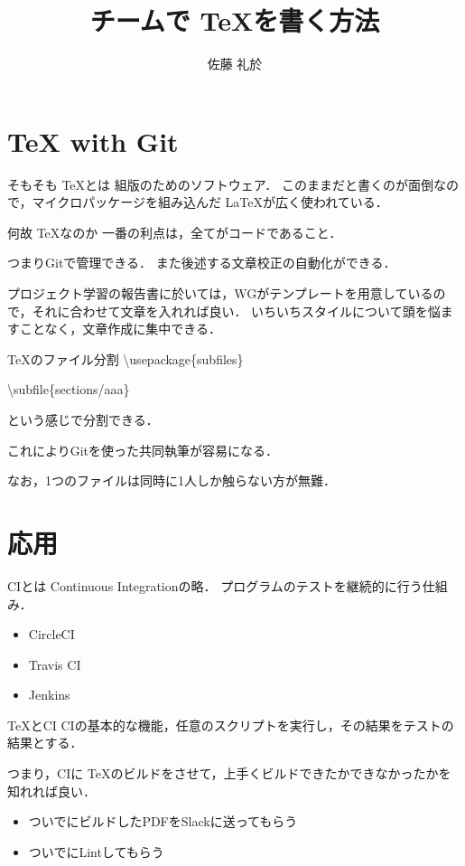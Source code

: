 \documentclass{beamer}
\title{チームで \TeX を書く方法}
\author{佐藤 礼於}
\begin{document}
\maketitle

\section{TeX with Git}

\begin{frame}{そもそも \TeX とは}
  組版のためのソフトウェア．
  このままだと書くのが面倒なので，マイクロパッケージを組み込んだ \LaTeX が広く使われている．
\end{frame}

\begin{frame}{何故 \TeX なのか}
  一番の利点は，全てがコードであること．

  つまりGitで管理できる．
  また後述する文章校正の自動化ができる．

  プロジェクト学習の報告書に於いては，WGがテンプレートを用意しているので，それに合わせて文章を入れれば良い．
  いちいちスタイルについて頭を悩ますことなく，文章作成に集中できる．
\end{frame}

\begin{frame}{\TeX のファイル分割}
  \textbackslash usepackage\{subfiles\}

  \textbackslash subfile\{sections/aaa\}

  という感じで分割できる．

  これによりGitを使った共同執筆が容易になる．

  なお，1つのファイルは同時に1人しか触らない方が無難．
\end{frame}


\section{応用}

\begin{frame}{CIとは}
  Continuous Integrationの略．
  プログラムのテストを継続的に行う仕組み．

  \begin{itemize}
    \item CircleCI
    \item Travis CI
    \item Jenkins
  \end{itemize}
\end{frame}

\begin{frame}{\TeX とCI}
  CIの基本的な機能，任意のスクリプトを実行し，その結果をテストの結果とする．

  つまり，CIに \TeX のビルドをさせて，上手くビルドできたかできなかったかを知れれば良い．

  \begin{itemize}
    \item ついでにビルドしたPDFをSlackに送ってもらう
    \item ついでにLintしてもらう
  \end{itemize}
\end{frame}
\end{document}
